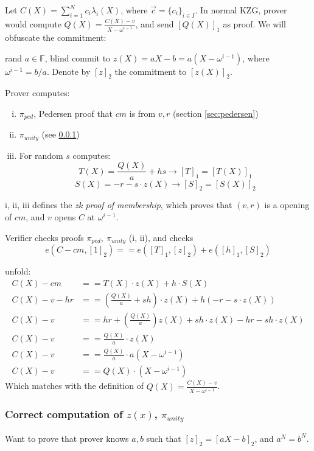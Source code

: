 \documentclass{article}
\theoremstyle{definition}
\begin{document}
Let $C(X) = \sum^N_{i=1} c_i \lambda_i(X)$, where $\overrightarrow{c} = \{c_i\}_{i \in I}$. In normal KZG, prover would compute $Q(X)=\frac{C(X)-v}{X-\omega^{i-1}}$, and  send $[Q(X)]_1$ as proof. We will obfuscate the commitment:

rand $a \in \mathbb{F}$, blind commit to $z(X)=aX - b = a(X - \omega^{i-1})$, where $\omega^{i-1}=b/a$. Denote by $[z]_2$ the commitment to $[z(X)]_2$.

Prover computes:
\begin{enumerate}[i.]
	\item $\pi_{ped}$, Pedersen proof that $cm$ is from $v, r$ (section \ref{sec:pedersen})
	\item $\pi_{unity}$ (see \ref{sec:pi-unity})
	\item For random $s$ computes:
		$$T(X)=\frac{Q(X)}{a} + hs \longrightarrow [T]_1=[T(X)]_1$$
		$$S(X) = -r - s \cdot z(X) \longrightarrow [S]_2 = [S(X)]_2$$
\end{enumerate}

i, ii, iii defines the \emph{zk proof of membership}, which proves that $(v, r)$ is a opening of $cm$, and $v$ opens $C$ at $\omega^{i-1}$.

Verifier checks proofs $\pi_{ped},~\pi_{unity}$ (i, ii), and checks
$$e(C - cm, [1]_2) == e([T]_1, [z]_2) + e([h]_1, [S]_2)$$

unfold:
\begin{align*}
	C(X) - cm &== T(X) \cdot z(X) + h \cdot S(X) \\
	C(X) - v - hr &== (\frac{Q(X)}{a} + s h) \cdot z(X) + h (-r -s \cdot z(X)) \\
	C(X) - v &== hr + (\frac{Q(X)}{a}) z(X) + sh \cdot z(X) - hr - sh \cdot z(X) \\
	C(X) - v &== \frac{Q(X)}{a} \cdot z(X) \\
	C(X) - v &== \frac{Q(X)}{a} \cdot a(X-\omega^{i-1}) \\
	C(X) -v &== Q(X) \cdot (X - \omega^{i-1})
\end{align*}
Which matches with the definition of $Q(X) = \frac{C(X) - v}{X-\omega^{i-1}}$.

\subsubsection{\texorpdfstring{Correct computation of $z(x)$, $\pi_{unity}$}%
				{Correct computation of proof unity}}\label{sec:pi-unity}

Want to prove that prover knows $a, b$ such that $[z]_2 = [a X - b]_2$, and $a^N = b^N$.
\end{document}
